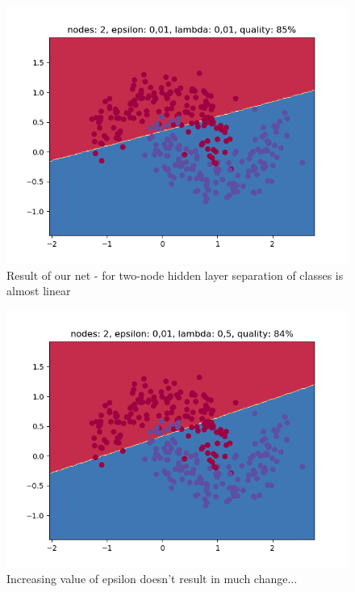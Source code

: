 \documentclass[3p,twocolumn]{elsarticle}
\begin{document}
\begin{figure}[h]
\label{fig:fig4}
  \includegraphics[width=\linewidth]{wykresy/1.png}
	\caption{Result of our net - for two-node hidden layer separation of classes is almost linear}
	\label{fig4}
\end{figure}

\begin{figure}[h]
\label{fig:fig4}
  \includegraphics[width=\linewidth]{wykresy/2.png}
	\caption{Increasing value of epsilon doesn't result in much change...}
	\label{fig4}
\end{figure}
\end{document}
